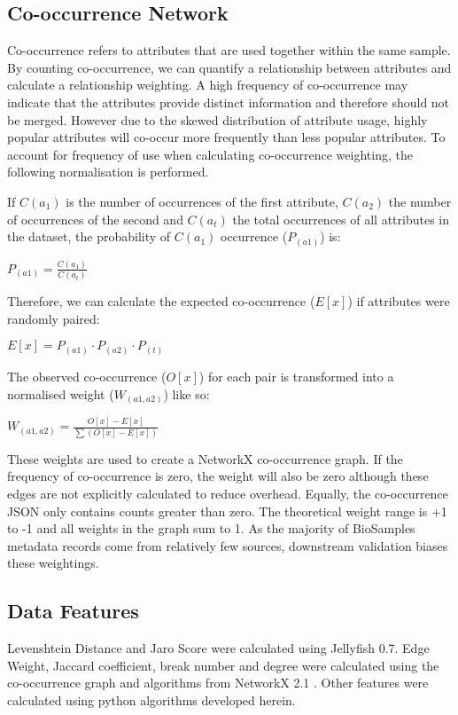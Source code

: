 \documentclass{bmcart}
\begin{document}
\subsection*{Co-occurrence Network}

Co-occurrence refers to attributes that are used together within the same sample. By counting co-occurrence, we can quantify a relationship between attributes and calculate a relationship weighting. A high frequency of co-occurrence may indicate that the attributes provide distinct information and therefore should not be merged. However due to the skewed distribution of attribute usage, highly popular attributes will co-occur more frequently than less popular attributes. To account for frequency of use when calculating co-occurrence weighting, the following normalisation is performed.


If $C(a_{1})$ is the number of occurrences of the first attribute, $C(a_{2})$ the number of occurrences of the second and $C(a_{t})$ the total occurrences of all attributes in the dataset, the probability of $C(a_{1})$ occurrence ($P_{(a1)}$) is:

$\displaystyle P_{(a1)} = \frac{C(a_{1})}{C(a_{t})}$

Therefore, we can calculate the expected co-occurrence ($E[x]$) if attributes were randomly paired:

$\displaystyle E[x] = P_{(a1)} \cdot P_{(a2)} \cdot P_{(t)}$

The observed co-occurrence ($O[x]$) for each pair is transformed into a normalised weight ($W_{(a1, a2)}$) like so:

$\displaystyle W_{(a1, a2)} = \frac{O[x] - E[x]}{\sum (O[x] - E[x])}$

These weights are used to create a NetworkX co-occurrence graph. If the frequency of co-occurrence is zero, the weight will also be zero although these edges are not explicitly calculated to reduce overhead. Equally, the co-occurrence JSON only contains counts greater than zero. The theoretical weight range is +1 to -1 and all weights in the graph sum to 1. As the majority of BioSamples metadata records come from relatively few sources, downstream validation biases these weightings. 

\subsection*{Data Features}

Levenshtein Distance \cite{levenshtein1966binary} and Jaro Score were calculated using Jellyfish 0.7. Edge Weight, Jaccard coefficient, break number and degree \cite{jaccard1901distribution} were calculated using the co-occurrence graph and algorithms from NetworkX 2.1 \cite{hagberg2008exploring}. Other features were calculated using python algorithms developed herein.
\end{document}
